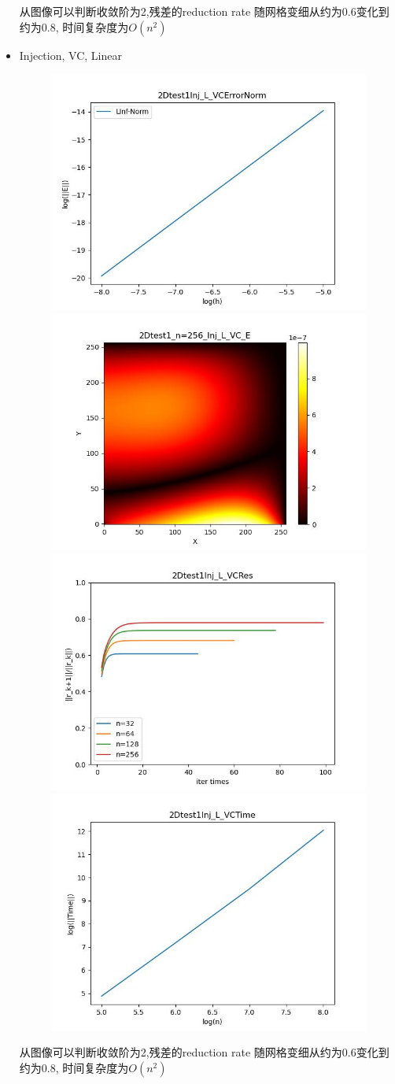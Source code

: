 \documentclass{article}
\begin{document}
\begin{itemize}
    从图像可以判断收敛阶为2,残差的reduction rate 随网格变细从约为0.6变化到约为0.8, 时间复杂度为$O(n^2)$
    \newpage
    \item Injection, VC, Linear
    \begin{figure}[h]
        \centering
        \includegraphics[width=0.35\linewidth]{2Dtest1Inj_L_VCErrorNorm.jpg}
        \includegraphics[width=0.35\linewidth]{2Dtest1_n=256_Inj_L_VC_E.jpg}
        \includegraphics[width=0.35\linewidth]{2Dtest1Inj_L_VCRes.jpg}
        \includegraphics[width=0.35\linewidth]{2Dtest1Inj_L_VCTime.jpg}
    \end{figure}
    
    从图像可以判断收敛阶为2,残差的reduction rate 随网格变细从约为0.6变化到约为0.8, 时间复杂度为$O(n^2)$
\end{itemize}
\end{document}
